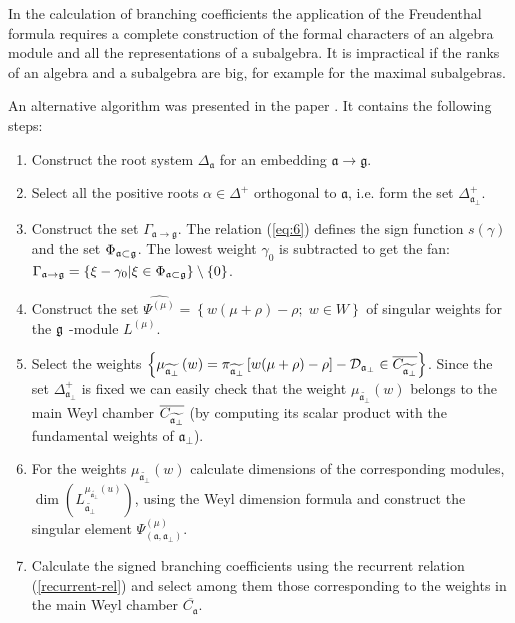 \documentclass[preprint,12pt]{elsarticle}
\newcommand{\gf}{\mathfrak{g}}
\newcommand{\af}{\mathfrak{a}}
\newcommand{\afb}{\mathfrak{a}_{\bot}}
\begin{document}
In the calculation of branching coefficients the application of the Freudenthal formula requires a complete construction of the formal characters of an algebra module and all the representations of a subalgebra. It is impractical if the ranks of an algebra and a subalgebra are big, for example for the maximal subalgebras.

An alternative algorithm was presented in the paper \cite{2010arXiv1007.0318L}. It contains the following steps:

\begin{enumerate}
\item  Construct the root system $\Delta _{\af}$ for an embedding $\af\rightarrow \gf$.
\item  Select all the positive roots $\alpha \in \Delta ^{+}$ orthogonal to  $\af$, i.e. form the set $\Delta_{\afb }^{+}$.
\item  Construct the set $\Gamma _{\af\rightarrow \gf}$. The relation (\ref{eq:6}) defines the sign function
 $s(\gamma)$ and the set $\Phi_{\af\subset \frak{g}}$. The lowest weight
 $\gamma_0$ is subtracted to get the fan:
 $\Gamma _{\af\rightarrow \frak{g}}=\left\{ \xi -\gamma _{0}|\xi \in \Phi _{%
\af\subset \frak{g}}\right\} \setminus \left\{ 0\right\}$.

\item  Construct the set $\widehat{\Psi ^{(\mu )}}=\left\{ w (\mu +\rho
)-\rho ;\;w \in W\right\} $ of singular weights for the $\frak{g}$%
-module $L^{(\mu )}$.

\item  Select the weights $\left\{ \mu _{\widetilde{\af_{\perp }}%
}\left( w\right) =\pi _{\widetilde{\af_{\perp }}}\left[ w(\mu +\rho
)-\rho \right] -\mathcal{D}_{\af_{\perp }}\in \overline{C_{\widetilde{%
\af_{\perp }}}}\right\} $. Since the set $\Delta_{\afb }^{+}$ is fixed
we can easily check that the weight $\mu _{\widetilde{\af_{\perp }}%
}\left( w\right) $ belongs to the main Weyl chamber $\overline{C_{\widetilde{%
\af_{\perp }}}}$ (by computing its scalar product with the fundamental
weights of $\afb$).

\item  For the weights $\mu _{\widetilde{\af_{\perp }}}\left( w\right) $
calculate dimensions of the corresponding modules, $\mathrm{\dim }\left(
L_{\widetilde{\af_{\perp }}}^{\mu _{\widetilde{\af_{\perp }}%
}\left( u\right) }\right) $, using the Weyl dimension formula and construct
the singular element $\Psi ^{\left( \mu \right) }_{\left(  \af, \afb \right)}$.

\item  Calculate the signed branching coefficients using 
the recurrent relation (\ref{recurrent-rel}) and select among them those
corresponding to the weights in the main Weyl
chamber $\overline{C_{\af}}$.
\end{enumerate}
\end{document}
